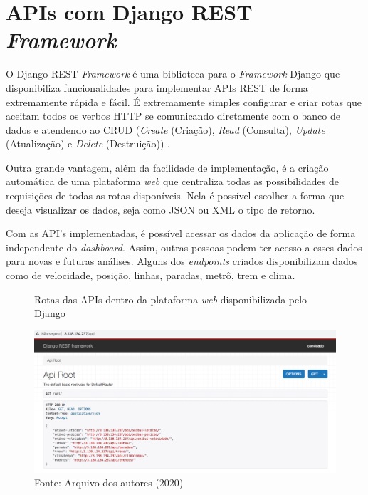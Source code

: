 \section{APIs com Django REST \textit{Framework}}
\indent
\par O Django REST \textit{Framework} é uma biblioteca para o \textit{Framework} Django que disponibiliza funcionalidades para implementar APIs REST de forma extremamente rápida e fácil. É extremamente simples configurar e criar rotas que aceitam todos os verbos HTTP se comunicando diretamente com o banco de dados e atendendo ao CRUD (\textit{Create} (Criação), \textit{Read} (Consulta), \textit{Update} (Atualização) e \textit{Delete} (Destruição)) \cite{Estevao2016}.
\indent
\par Outra grande vantagem, além da facilidade de implementação, é a criação automática de uma plataforma \textit{web} que centraliza todas as possibilidades de requisições de todas as rotas disponíveis. Nela é possível escolher a forma que deseja visualizar os dados, seja como JSON ou XML o tipo de retorno.
\indent
\par Com as API’s implementadas, é possível acessar os dados da aplicação de forma independente do \textit{dashboard}. Assim, outras pessoas podem ter acesso a esses dados para novas e futuras análises. Alguns dos \textit{endpoints} criados disponibilizam dados como de velocidade, posição, linhas, paradas, metrô, trem e clima.

\begin{figure}[H]
    \centering
    \caption{Rotas das APIs dentro da plataforma \textit{web} disponibilizada pelo Django}
    \includegraphics[width=1.0\linewidth]{Imagens/rotasDisponiveis.png}
    \caption*{Fonte: Arquivo dos autores (2020)}
    \label{rotasDisponiveis}
\end{figure}

